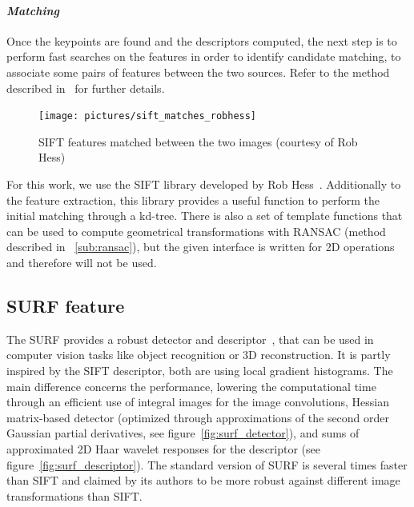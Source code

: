 \clearpage
\paragraph{\emph{Matching}}

Once the keypoints are found and the descriptors computed, the next step is to perform fast searches on the features in order to identify candidate matching, to associate some pairs of features between the two sources. Refer to the method described in~\cite{lowe_2004_sift} for further details.

\begin{figure}[h]
\centering
\texttt{[image: pictures/sift\_matches\_robhess]}
\caption{SIFT features matched between the two images (courtesy of Rob Hess)}
\end{figure}

For this work, we use the \gls{SIFT} library developed by Rob Hess~\cite{hess_sift}. Additionally to the feature extraction, this library provides a useful function to perform the initial matching through a kd-tree. There is also a set of template functions that can be used to compute geometrical transformations with \gls{RANSAC} (method described in ~\ref{sub:ransac}), but the given interface is written for 2D operations and therefore will not be used.

\subsection{SURF feature}

The \gls{SURF} provides a robust detector and descriptor~\cite{surf}, that can be used in computer vision tasks like object recognition or 3D reconstruction. It is partly inspired by the \gls{SIFT} descriptor, both are using local gradient histograms. The main difference concerns the performance, lowering the computational time through an efficient use of integral images for the image convolutions, Hessian matrix-based detector (optimized through approximations of the second order Gaussian partial derivatives, see figure~\ref{fig:surf_detector}), and sums of approximated 2D Haar wavelet responses for the descriptor (see figure~\ref{fig:surf_descriptor}). The standard version of \gls{SURF} is several times faster than \gls{SIFT} and claimed by its authors to be more robust against different image transformations than \gls{SIFT}.

